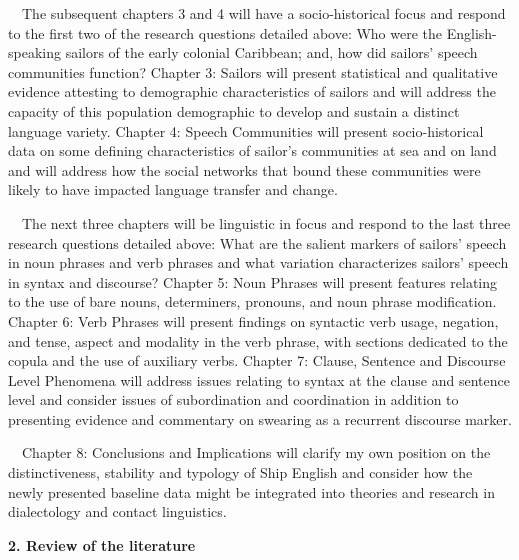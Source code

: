 \begin{styleNormali}
\ \ The subsequent chapters 3 and 4 will have a socio-historical focus and respond to the first two of the research questions detailed above: Who were the English-speaking sailors of the early colonial Caribbean; and, how did sailors’ speech communities function? Chapter 3: Sailors will present statistical and qualitative evidence attesting to demographic characteristics of sailors and will address the capacity of this population demographic to develop and sustain a distinct language variety. Chapter 4: Speech Communities will present socio-historical data on some defining characteristics of sailor’s communities at sea and on land and will address how the social networks that bound these communities were likely to have impacted language transfer and change. \ 
\end{styleNormali}

\begin{styleNormali}
\ \ The next three chapters will be linguistic in focus and respond to the last three research questions detailed above: What are the salient markers of sailors’ speech in noun phrases and verb phrases and what variation characterizes sailors’ speech in syntax and discourse? Chapter 5: Noun Phrases will present features relating to the use of bare nouns, determiners, pronouns, and noun phrase modification. Chapter 6: Verb Phrases will present findings on syntactic verb usage, negation, and tense, aspect and modality in the verb phrase, with sections dedicated to the copula and the use of auxiliary verbs. Chapter 7: Clause, Sentence and Discourse Level Phenomena will address issues relating to syntax at the clause and sentence level and consider issues of subordination and coordination in addition to presenting evidence and commentary on swearing as a recurrent discourse marker.
\end{styleNormali}

\begin{styleNormali}
\ \ Chapter 8: Conclusions and Implications will clarify my own position on the distinctiveness, stability and typology of Ship English and consider how the newly presented baseline data might be integrated into theories and research in dialectology and contact linguistics.
\end{styleNormali}

\clearpage\begin{styleStandard}
\textbf{2. Review of the literature}
\end{styleStandard}

